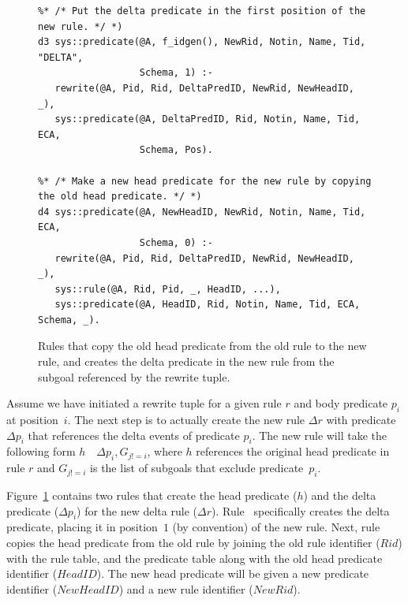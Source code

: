 \begin{figure}[!t]
\ssp
\centering
\begin{lstlisting}
%* /* Put the delta predicate in the first position of the new rule. */ *)
d3 sys::predicate(@A, f_idgen(), NewRid, Notin, Name, Tid, "DELTA", 
                  Schema, 1) :-
   rewrite(@A, Pid, Rid, DeltaPredID, NewRid, NewHeadID, _),
   sys::predicate(@A, DeltaPredID, Rid, Notin, Name, Tid, ECA, 
                  Schema, Pos).

%* /* Make a new head predicate for the new rule by copying the old head predicate. */ *)
d4 sys::predicate(@A, NewHeadID, NewRid, Notin, Name, Tid, ECA, 
                  Schema, 0) :-
   rewrite(@A, Pid, Rid, DeltaPredID, NewRid, NewHeadID, _),
   sys::rule(@A, Rid, Pid, _, HeadID, ...),
   sys::predicate(@A, HeadID, Rid, Notin, Name, Tid, ECA, Schema, _).
\end{lstlisting}
\caption{\label{ch:evita:fig:delta2}Rules that copy the old head predicate from the old rule
to the new rule, and creates the delta predicate in the new rule from the subgoal referenced
by the rewrite tuple.}
\end{figure}

Assume we have initiated a rewrite tuple for a given rule $r$ and body
predicate $p_i$ at position~$i$.  The next step is to actually create the new
rule $\Delta r$ with predicate $\Delta p_i$ that references the delta events of
predicate $p_i$.  The new rule will take the following form $h$~\ol{:-}~$\Delta
p_i, G_{j!=i}$, where $h$ references the original head predicate in rule $r$
and $G_{j!=i}$ is the list of subgoals that exclude predicate~$p_i$.

Figure~\ref{ch:evita:fig:delta2} contains two rules that create the head
predicate ($h$) and the delta predicate ($\Delta p_i$) for the new delta rule
($\Delta r$).  Rule~ specifically creates the delta predicate, placing
it in position~$1$ (by convention) of the new rule.  Next, rule~ copies
the head predicate from the old rule by joining the old rule identifier ($Rid$)
with the rule table, and the predicate table along with the old head predicate
identifier ($HeadID$).  The new head predicate will be given a new predicate
identifier ($NewHeadID$) and a new rule identifier ($NewRid$).


